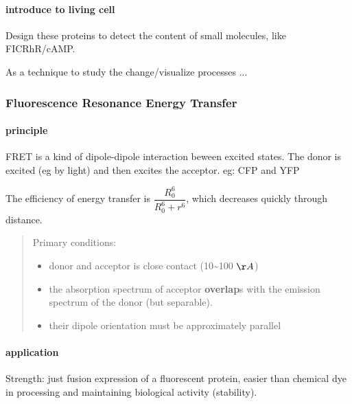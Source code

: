\documentclass[]{article}
\let\oldparagraph\paragraph
\renewcommand{\paragraph}[1]{\oldparagraph{#1}\mbox{}}
\begin{document}
\hypertarget{introduce-to-living-cell}{%
\paragraph{introduce to living cell}\label{introduce-to-living-cell}}

Design these proteins to detect the content of small molecules, like
FICRhR/cAMP.

As a technique to study the change/visualize processes ...

\hypertarget{fluorescence-resonance-energy-transfer}{%
\subsubsection{Fluorescence Resonance Energy
Transfer}\label{fluorescence-resonance-energy-transfer}}

\hypertarget{principle-3}{%
\paragraph{principle}\label{principle-3}}

FRET is a kind of dipole-dipole interaction beween excited states. The
donor is excited (eg by light) and then excites the acceptor. eg: CFP
and YFP

The efficiency of energy transfer is \(\dfrac{R_0^6}{R_0^6+r^6}\), which
decreases quickly through distance.

\begin{quote}
Primary conditions:

\begin{itemize}
\item
  donor and acceptor is close contact (10\textasciitilde{}100 \(\AA\))
\item
  the absorption spectrum of acceptor \textbf{overlap}s with the
  emission spectrum of the donor (but separable).
\item
  their dipole orientation must be approximately parallel
\end{itemize}
\end{quote}

\hypertarget{application-2}{%
\paragraph{application}\label{application-2}}

Strength: just fusion expression of a fluorescent protein, easier than
chemical dye in processing and maintaining biological activity
(stability).
\end{document}

